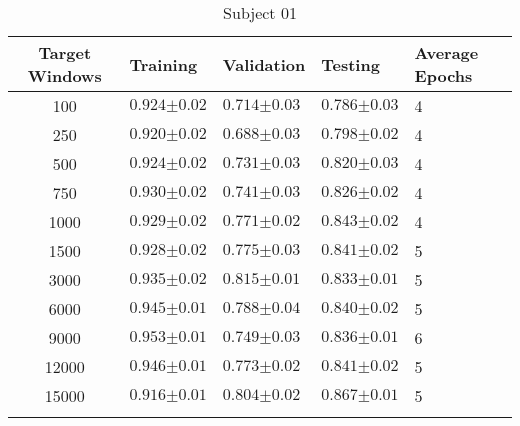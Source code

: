 \begin{table}[H]
    \centering
    \caption[Classification accuracy for a 32 unit  model with the  layer retrained with increasing amount of target data]{Classification accuracy for a 32 unit \acrshort{lstm} model with the dense layer retrained  with increasing amount of target data. The table shows the classification accuracy for the target user training, validation and testing $\pm\sigma (n=25)$. A value of one represents 100\% correct classification.}
    \label{tab:classifcation_performance_frozen-dense-layer}
    \begin{subtable}{\textwidth}
    \caption{Subject 01}
    \begin{tabularx}{\textwidth}{cYYYY}
        Target Windows & Training & Validation & Testing & Average Epochs \\
         & $0.924{\scriptscriptstyle\pm0.02}$ & $0.714{\scriptscriptstyle\pm0.03}$ & $0.786{\scriptscriptstyle\pm0.03}$ & 4 \\
250 & $0.920{\scriptscriptstyle\pm0.02}$ & $0.688{\scriptscriptstyle\pm0.03}$ & $0.798{\scriptscriptstyle\pm0.02}$ & 4 \\
500 & $0.924{\scriptscriptstyle\pm0.02}$ & $0.731{\scriptscriptstyle\pm0.03}$ & $0.820{\scriptscriptstyle\pm0.03}$ & 4 \\
750 & $0.930{\scriptscriptstyle\pm0.02}$ & $0.741{\scriptscriptstyle\pm0.03}$ & $0.826{\scriptscriptstyle\pm0.02}$ & 4 \\
1000 & $0.929{\scriptscriptstyle\pm0.02}$ & $0.771{\scriptscriptstyle\pm0.02}$ & $0.843{\scriptscriptstyle\pm0.02}$ & 4 \\
1500 & $0.928{\scriptscriptstyle\pm0.02}$ & $0.775{\scriptscriptstyle\pm0.03}$ & $0.841{\scriptscriptstyle\pm0.02}$ & 5 \\
3000 & $0.935{\scriptscriptstyle\pm0.02}$ & $0.815{\scriptscriptstyle\pm0.01}$ & $0.833{\scriptscriptstyle\pm0.01}$ & 5 \\
6000 & $0.945{\scriptscriptstyle\pm0.01}$ & $0.788{\scriptscriptstyle\pm0.04}$ & $0.840{\scriptscriptstyle\pm0.02}$ & 5 \\
9000 & $0.953{\scriptscriptstyle\pm0.01}$ & $0.749{\scriptscriptstyle\pm0.03}$ & $0.836{\scriptscriptstyle\pm0.01}$ & 6 \\
12000 & $0.946{\scriptscriptstyle\pm0.01}$ & $0.773{\scriptscriptstyle\pm0.02}$ & $0.841{\scriptscriptstyle\pm0.02}$ & 5 \\
15000 & $0.916{\scriptscriptstyle\pm0.01}$ & $0.804{\scriptscriptstyle\pm0.02}$ & $0.867{\scriptscriptstyle\pm0.01}$ & 5 \\
          \\
    \end{tabularx}
    \end{subtable}
\end{table}
